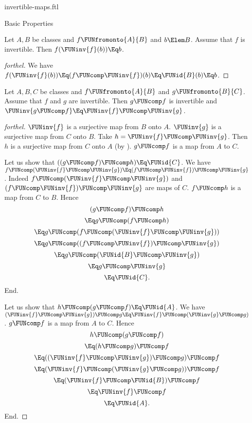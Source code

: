 \documentclass{stex}
\begin{document}
\begin{smodule}{invertible-maps.ftl}
\begin{sfragment}{Basic Properties}
  \begin{proposition}[forthel]
    Let $A, B$ be classes and $f \FUNfromonto{A}{B}$ and $b \Elem B$.
    Assume that $f$ is invertible.
    Then $f(\FUNinv{f}(b)) \Eq b$.
  \end{proposition}
  \begin{proof}[forthel]
    We have
    $f(\FUNinv{f}(b))
      \Eq (f \FUNcomp \FUNinv{f})(b)
      \Eq \FUNid{B}(b)
      \Eq b$.
  \end{proof}


  \begin{proposition}[forthel,name=invertibility of composition of invertible maps]
    Let $A, B, C$ be classes and $f \FUNfromonto{A}{B}$ and $g \FUNfromonto{B}{C}$.
    Assume that $f$ and $g$ are invertible.
    Then $g \FUNcomp f$ is invertible and $\FUNinv{g \FUNcomp f} \Eq \FUNinv{f} \FUNcomp \FUNinv{g}$.
  \end{proposition}
  \begin{proof}[forthel]
    $\FUNinv{f}$ is a surjective map from $B$ onto $A$.
    $\FUNinv{g}$ is a surjective map from $C$ onto $B$.
    Take $h = \FUNinv{f} \FUNcomp \FUNinv{g}$.
    Then $h$ is a surjective map from $C$ onto $A$ (by ).
    $g \FUNcomp f$ is a map from $A$ to $C$.

    Let us show that $((g \FUNcomp f) \FUNcomp h) \Eq \FUNid{C}$.
      We have $f \FUNcomp (\FUNinv{f} \FUNcomp \FUNinv{g}) \Eq (f \FUNcomp \FUNinv{f}) \FUNcomp \FUNinv{g}$.
      Indeed $f \FUNcomp (\FUNinv{f} \FUNcomp \FUNinv{g})$ and $(f \FUNcomp \FUNinv{f}) \FUNcomp \FUNinv{g}$ are maps of $C$.
      $f \FUNcomp h$ is a map from $C$ to $B$.
      Hence
      \[  (g \FUNcomp f) \FUNcomp h                           \]
      \[    \Eq g \FUNcomp (f \FUNcomp h)                       \]
      \[    \Eq g \FUNcomp (f \FUNcomp (\FUNinv{f} \FUNcomp \FUNinv{g}))   \]
      \[    \Eq g \FUNcomp ((f \FUNcomp \FUNinv{f}) \FUNcomp \FUNinv{g})   \]
      \[    \Eq g \FUNcomp (\FUNid{B} \FUNcomp \FUNinv{g})            \]
      \[    \Eq g \FUNcomp \FUNinv{g}                            \]
      \[    \Eq \FUNid{C}.                                  \]
    End.

    Let us show that $h \FUNcomp (g \FUNcomp f) \Eq \FUNid{A}$.
      We have $(\FUNinv{f} \FUNcomp \FUNinv{g}) \FUNcomp g \Eq \FUNinv{f} \FUNcomp (\FUNinv{g} \FUNcomp g)$.
      $g \FUNcomp f$ is a map from $A$ to $C$.
      Hence
      \[  h \FUNcomp (g \FUNcomp f)                           \]
      \[    \Eq (h \FUNcomp g) \FUNcomp f                       \]
      \[    \Eq ((\FUNinv{f} \FUNcomp \FUNinv{g}) \FUNcomp g) \FUNcomp f   \]
      \[    \Eq (\FUNinv{f} \FUNcomp (\FUNinv{g} \FUNcomp g)) \FUNcomp f   \]
      \[    \Eq (\FUNinv{f} \FUNcomp \FUNid{B}) \FUNcomp f            \]
      \[    \Eq \FUNinv{f} \FUNcomp f                            \]
      \[    \Eq \FUNid{A}.                                  \]
    End.


\end{proof}
\end{sfragment}
\end{smodule}
\end{document}
